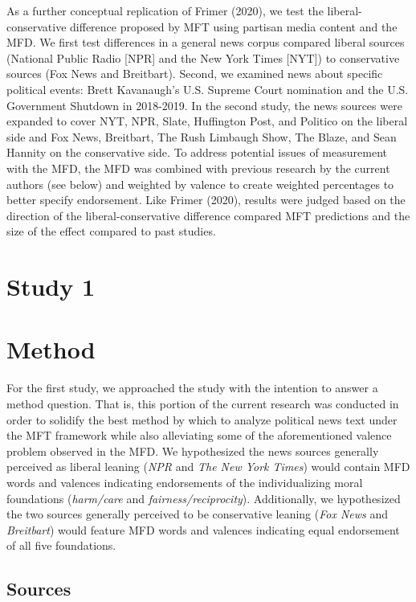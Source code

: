\documentclass[
  man,floatsintext]{apa6}
\begin{document}
As a further conceptual replication of Frimer (2020), we test the liberal-conservative difference proposed by MFT using partisan media content and the MFD. We first test differences in a general news corpus compared liberal sources (National Public Radio {[}NPR{]} and the New York Times {[}NYT{]}) to conservative sources (Fox News and Breitbart). Second, we examined news about specific political events: Brett Kavanaugh's U.S. Supreme Court nomination and the U.S. Government Shutdown in 2018-2019. In the second study, the news sources were expanded to cover NYT, NPR, Slate, Huffington Post, and Politico on the liberal side and Fox News, Breitbart, The Rush Limbaugh Show, The Blaze, and Sean Hannity on the conservative side. To address potential issues of measurement with the MFD, the MFD was combined with previous research by the current authors (see below) and weighted by valence to create weighted percentages to better specify endorsement. Like Frimer (2020), results were judged based on the direction of the liberal-conservative difference compared MFT predictions and the size of the effect compared to past studies.

\hypertarget{study-1}{%
\section{Study 1}\label{study-1}}

\hypertarget{method}{%
\section{Method}\label{method}}

For the first study, we approached the study with the intention to answer a method question. That is, this portion of the current research was conducted in order to solidify the best method by which to analyze political news text under the MFT framework while also alleviating some of the aforementioned valence problem observed in the MFD. We hypothesized the news sources generally perceived as liberal leaning (\emph{NPR} and \emph{The New York Times}) would contain MFD words and valences indicating endorsements of the individualizing moral foundations (\emph{harm/care} and \emph{fairness/reciprocity}). Additionally, we hypothesized the two sources generally perceived to be conservative leaning (\emph{Fox News} and \emph{Breitbart}) would feature MFD words and valences indicating equal endorsement of all five foundations.

\hypertarget{sources}{%
\subsection{Sources}\label{sources}}
\end{document}
